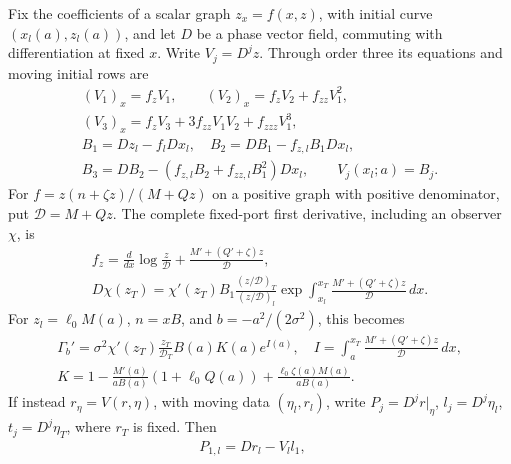\begin{lemma}
\label{deg:lem-scalar-moving-identities}
Fix the coefficients of a scalar graph \(z_x=f(x,z)\), with initial
curve \((x_l(a),z_l(a))\), and let \(D\) be a phase vector field,
commuting with differentiation at fixed \(x\). Write \(V_j=D^jz\).
Through order three its equations and moving initial rows are
\begin{equation}\label{deg:scalar-moving-bell}
 \begin{gathered}
 (V_1)_x=f_zV_1,\qquad (V_2)_x=f_zV_2+f_{zz}V_1^2,\\
 (V_3)_x=f_zV_3+3f_{zz}V_1V_2+f_{zzz}V_1^3,\\
 B_1=Dz_l-f_lDx_l,\quad B_2=DB_1-f_{z,l}B_1Dx_l,\\
 B_3=DB_2-(f_{z,l}B_2+f_{zz,l}B_1^2)Dx_l,
 \qquad V_j(x_l;a)=B_j .
 \end{gathered}
\end{equation}
For \(f=z(n+\zeta z)/(M+Qz)\) on a positive graph with positive
denominator, put \(\mathscr D=M+Qz\).
The complete fixed-port first derivative, including an observer \(\chi\), is
\begin{equation}\label{deg:scalar-raw-cocycle}
 \begin{gathered}
 f_z=\frac d{dx}\log\frac z{\mathscr D}
          +\frac{M'+(Q'+\zeta)z}{\mathscr D},\\
 D\chi(z_T)=\chi'(z_T)B_1
    \frac{(z/\mathscr D)_T}{(z/\mathscr D)_l}
    \exp\int_{x_l}^{x_T}\frac{M'+(Q'+\zeta)z}{\mathscr D}\,dx .
 \end{gathered}
\end{equation}
For \(z_l=\ell_0M(a)\), \(n=xB\), and
\(b=-a^2/(2\sigma^2)\), this becomes
\begin{equation}\label{deg:scalar-polynomial-lip-slope}
 \begin{gathered}
 \Gamma_b'=\sigma^2\chi'(z_T)\frac{z_T}{\mathscr D_T}B(a)K(a)e^{I(a)},
 \quad I=\int_a^{x_T}\frac{M'+(Q'+\zeta)z}{\mathscr D}\,dx,\\
 K=1-\frac{M'(a)}{aB(a)}(1+\ell_0Q(a))
       +\frac{\ell_0\zeta(a)M(a)}{aB(a)}.
 \end{gathered}
\end{equation}
If instead \(r_\eta=V(r,\eta)\), with moving data
\((\eta_l,r_l)\), write \(P_j=D^jr|_\eta\), \(l_j=D^j\eta_l\),
\(t_j=D^j\eta_T\), where \(r_T\) is fixed. Then
\begin{equation}\label{deg:scalar-inverse-endpoints}
 \begin{gathered}
 P_{1,l}=Dr_l-V_ll_1,\quad

\end{gathered}
\end{equation}
\end{lemma}
